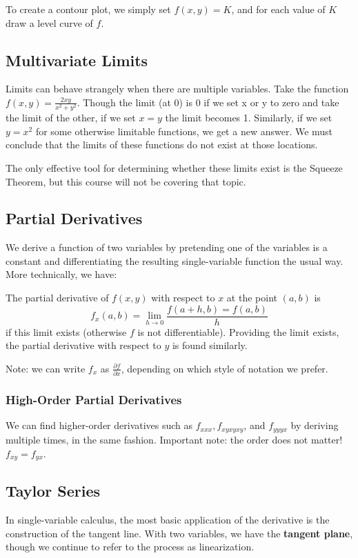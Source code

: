 \documentclass[12pt]{article}
\begin{document}
To create a contour plot, we simply set $f(x,y) = K$, and for each value of $K$ draw a level curve of $f$.

\subsection*{Multivariate Limits}
Limits can behave strangely when there are multiple variables. Take the function $f(x,y) = \frac{2xy}{x^2 + y^2}$. Though the limit (at 0) is 0 if we set x or y to zero and take the limit of the other, if we set $x = y$ the limit becomes 1. Similarly, if we set $y = x^2$ for some otherwise limitable functions, we get a new answer. We must conclude that the limits of these functions do not exist at those locations.

The only effective tool for determining whether these limits exist is the Squeeze Theorem, but this course will not be covering that topic.

\subsection*{Partial Derivatives}
We derive a function of two variables by pretending one of the variables is a constant and differentiating the resulting single-variable function the usual way. More technically, we have:

 The partial derivative of $f(x,y)$ with respect to $x$ at the point $(a,b)$ is \[ f_x(a,b) = \lim_{h\to 0} \frac{f(a+h, b) = f(a,b)}{h} \] if this limit exists (otherwise $f$ is not differentiable). Providing the limit exists, the partial derivative with respect to $y$ is found similarly.

Note: we can write $f_x$ as $\frac{\partial f}{\partial x}$, depending on which style of notation we prefer.

\subsubsection*{High-Order Partial Derivatives}
We can find higher-order derivatives such as $f_{xxx}, f_{xyxyxy}$, and $f_{yyyx}$ by deriving multiple times, in the same fashion. Important note: the order does not matter! $f_{xy} = f_{yx}$.

\subsection*{Taylor Series}
In single-variable calculus, the most basic application of the derivative is the construction of the tangent line. With two variables, we have the {\bf tangent plane}, though we continue to refer to the process as linearization. 
\end{document}
